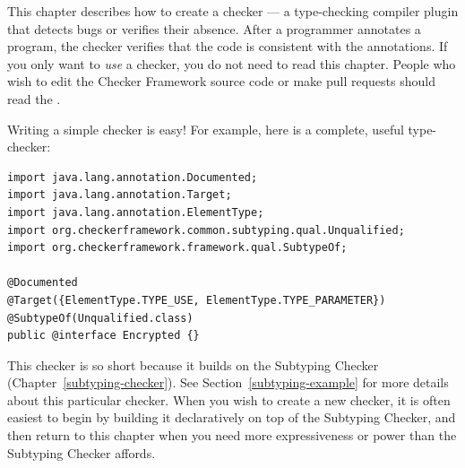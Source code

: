 \htmlhr
{}
\label{writing-a-checker} %

\newcommand{\TreeAPIBase}{https://docs.oracle.com/en/java/javase/25/docs/api/jdk.compiler/com/sun/source}
\newcommand{\refTreeclass}[2]{\href{\TreeAPIBase{}/#1/#2.html?is-external=true}{\<#2>}}
\newcommand{\ModelAPIBase}{https://docs.oracle.com/en/java/javase/25/docs/api/java.compiler/javax/lang/model}
\newcommand{\refModelclass}[2]{\href{\ModelAPIBase{}/#1/#2.html?is-external=true}{\<#2>}}

This chapter describes how to create a checker
--- a type-checking compiler plugin that detects bugs or verifies their
absence.  After a programmer annotates a program,
the checker verifies that the code is consistent
with the annotations.
If you only want to \emph{use} a checker, you do not need to read this
chapter.
People who wish to edit the Checker Framework source code or
make pull requests should read the
.


Writing a simple checker is easy!  For example, here is a complete, useful
type-checker:

\begin{Verbatim}
import java.lang.annotation.Documented;
import java.lang.annotation.Target;
import java.lang.annotation.ElementType;
import org.checkerframework.common.subtyping.qual.Unqualified;
import org.checkerframework.framework.qual.SubtypeOf;

@Documented
@Target({ElementType.TYPE_USE, ElementType.TYPE_PARAMETER})
@SubtypeOf(Unqualified.class)
public @interface Encrypted {}
\end{Verbatim}

This checker is so short because it builds on the Subtyping Checker
(Chapter~\ref{subtyping-checker}).
See Section~\ref{subtyping-example} for more details about this particular checker.
When you wish to create a new checker, it is often easiest to begin by
building it declaratively on top of the Subtyping Checker, and then return to
this chapter when you need more expressiveness or power than the Subtyping
Checker affords.

